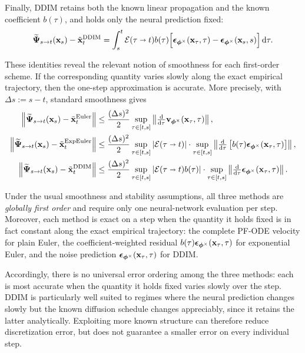 Finally, DDIM retains both the known linear propagation and the known
coefficient $b(\tau)$, and holds only the neural prediction fixed:
\begin{align}
\label{eq:ddim-local-defect}
\widetilde{{\bm{\Psi}}}_{s\to t}({\mathbf{x}}_s)
-
\tilde{{\mathbf{x}}}_t^{\mathrm{DDIM}}
=
\int_s^t
\mathcal E(\tau\shortrightarrow t)b(\tau)
\Big[
{\bm{\epsilon}}_{\bm{\phi}^\times}({\mathbf{x}}_\tau,\tau)
-
{\bm{\epsilon}}_{\bm{\phi}^\times}({\mathbf{x}}_s,s)
\Big]
\mathop{}\!\mathrm{d}\tau.
\end{align}

These identities reveal the relevant notion of smoothness for each first-order
scheme. If the corresponding quantity varies slowly along the exact empirical
trajectory, then the one-step approximation is accurate. More precisely,
with $\Delta s:=s-t$, standard smoothness gives
\begin{align*}
\left\|
\widetilde{{\bm{\Psi}}}_{s\to t}({\mathbf{x}}_s)
-
\tilde{{\mathbf{x}}}_t^{\mathrm{Euler}}
\right\|
&\le
\frac{(\Delta s)^2}{2}
\sup_{\tau\in[t,s]}
\left\|
\tfrac{\mathop{}\!\mathrm{d}}{\mathop{}\!\mathrm{d}\tau}
{\mathbf{v}}_{\bm{\phi}^\times}({\mathbf{x}}_\tau,\tau)
\right\|,
\\
\left\|
\widetilde{{\bm{\Psi}}}_{s\to t}({\mathbf{x}}_s)
-
\tilde{{\mathbf{x}}}_t^{\mathrm{ExpEuler}}
\right\|
&\le
\frac{(\Delta s)^2}{2}
\sup_{\tau\in[t,s]}
\left|
\mathcal E(\tau\shortrightarrow t)
\right|\cdot
\sup_{\tau\in[t,s]}
\left\|
\tfrac{\mathop{}\!\mathrm{d}}{\mathop{}\!\mathrm{d}\tau}
\left[
b(\tau)
{\bm{\epsilon}}_{\bm{\phi}^\times}({\mathbf{x}}_\tau,\tau)
\right]
\right\|,
\\
\left\|
\widetilde{{\bm{\Psi}}}_{s\to t}({\mathbf{x}}_s)
-
\tilde{{\mathbf{x}}}_t^{\mathrm{DDIM}}
\right\|
&\le
\frac{(\Delta s)^2}{2}
\sup_{\tau\in[t,s]}
\left|
\mathcal E(\tau\shortrightarrow t)b(\tau)
\right| \cdot
\sup_{\tau\in[t,s]}
\left\|
\tfrac{\mathop{}\!\mathrm{d}}{\mathop{}\!\mathrm{d}\tau}
{\bm{\epsilon}}_{\bm{\phi}^\times}({\mathbf{x}}_\tau,\tau)
\right\|.
\end{align*}

Under the usual smoothness and stability assumptions, all three methods are
\emph{globally first order} and require only one neural-network evaluation per
step. Moreover, each method is exact on a step when the quantity it holds
fixed is in fact constant along the exact empirical trajectory: the complete
PF-ODE velocity for plain Euler, the coefficient-weighted residual
$b(\tau){\bm{\epsilon}}_{\bm{\phi}^\times}({\mathbf{x}}_\tau,\tau)$ for exponential Euler, and
the noise prediction
${\bm{\epsilon}}_{\bm{\phi}^\times}({\mathbf{x}}_\tau,\tau)$ for DDIM.

Accordingly, there is no universal error ordering among the three methods:
each is most accurate when the quantity it holds fixed varies slowly over the
step. DDIM is particularly well suited to regimes where the neural prediction
changes slowly but the known diffusion schedule changes appreciably, since it
retains the latter analytically. Exploiting more known structure can therefore
reduce discretization error, but does not guarantee a smaller error on every
individual step.


